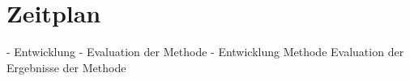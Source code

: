 \chapter{Zeitplan}\label{ch:Zeitplan}



- Entwicklung
- Evaluation der Methode
- Entwicklung Methode Evaluation der Ergebnisse der Methode